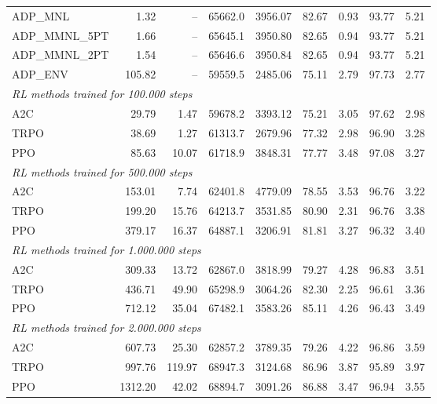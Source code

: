 \begin{samepage}
\begin{center}
\begin{tabular}{l|rr|rr|rr|rr}
    ADP\_MNL     &     1.32 &    -- &    65662.0 &    3956.07 &   82.67 &    0.93 &   93.77 &    5.21 \\
    ADP\_MMNL\_5PT &     1.66 &    -- &    65645.1 &    3950.80 &   82.65 &    0.94 &   93.77 &    5.21 \\
    ADP\_MMNL\_2PT &     1.54 &    -- &    65646.6 &    3950.84 &   82.65 &    0.94 &   93.77 &    5.21 \\
    ADP\_ENV     &   105.82 &    -- &    59559.5 &    2485.06 &   75.11 &    2.79 &   97.73 &    2.77 \\
    \midrule
    \multicolumn{9}{l}{\textit{RL methods trained for 100.000 steps}} \\
    \midrule
    A2C          &    29.79 &     1.47 &    59678.2 &    3393.12 &   75.21 &    3.05 &   97.62 &    2.98 \\
    TRPO         &    38.69 &     1.27 &    61313.7 &    2679.96 &   77.32 &    2.98 &   96.90 &    3.28 \\
    PPO          &    85.63 &    10.07 &    61718.9 &    3848.31 &   77.77 &    3.48 &   97.08 &    3.27 \\
    \midrule
    \multicolumn{9}{l}{\textit{RL methods trained for 500.000 steps}} \\
    \midrule
    A2C          &   153.01 &     7.74 &    62401.8 &    4779.09 &   78.55 &    3.53 &   96.76 &    3.22 \\
    TRPO         &   199.20 &    15.76 &    64213.7 &    3531.85 &   80.90 &    2.31 &   96.76 &    3.38 \\
    PPO          &   379.17 &    16.37 &    64887.1 &    3206.91 &   81.81 &    3.27 &   96.32 &    3.40 \\
    \midrule
    \multicolumn{9}{l}{\textit{RL methods trained for 1.000.000 steps}} \\
    \midrule
    A2C          &   309.33 &    13.72 &    62867.0 &    3818.99 &   79.27 &    4.28 &   96.83 &    3.51 \\
    TRPO         &   436.71 &    49.90 &    65298.9 &    3064.26 &   82.30 &    2.25 &   96.61 &    3.36 \\
    PPO          &   712.12 &    35.04 &    67482.1 &    3583.26 &   85.11 &    4.26 &   96.43 &    3.49 \\
    \midrule
    \multicolumn{9}{l}{\textit{RL methods trained for 2.000.000 steps}} \\
    \midrule
    A2C          &   607.73 &    25.30 &    62857.2 &    3789.35 &   79.26 &    4.22 &   96.86 &    3.59 \\
    TRPO         &   997.76 &   119.97 &    68947.3 &    3124.68 &   86.96 &    3.87 &   95.89 &    3.97 \\
    PPO          &  1312.20 &    42.02 &    68894.7 &    3091.26 &   86.88 &    3.47 &   96.94 &    3.55 \\
    \bottomrule
  \end{tabular}
\end{center}
\end{samepage}

